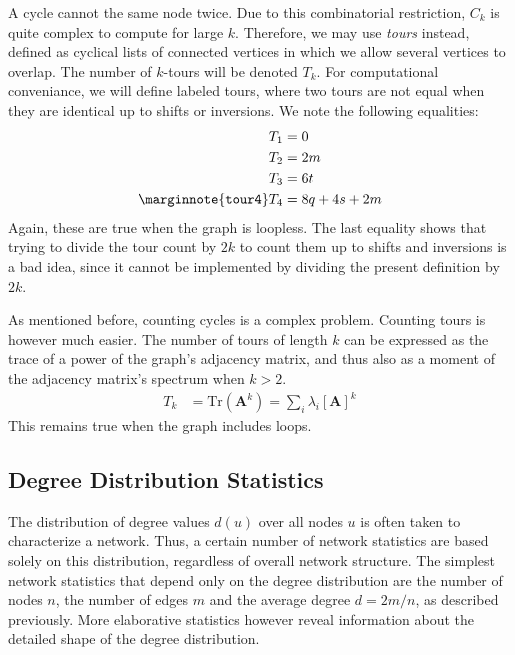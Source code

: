 \documentclass{article}
\begin{document}
A cycle cannot the same node twice.  Due to this combinatorial
restriction, $C_k$ is quite complex to compute for large $k$.
Therefore, we may use \emph{tours} instead, defined as cyclical lists of
connected vertices in which we allow several vertices to overlap.  The
number of $k$-tours will be denoted $T_k$.  For computational
conveniance, we will define labeled tours, where two tours are not equal
when they are identical up to shifts or inversions.  
We note the following equalities: 
\begin{align}
  T_1 &= 0 \nonumber \\
  T_2 &= 2m \nonumber \\
  T_3 &= 6t \nonumber \\
  \marginnote{\texttt{tour4}}
  T_4 &= 8q + 4s + 2m 
\end{align}
Again, these are true when the graph is loopless.  The last equality
shows that trying to divide the tour count by $2k$ to count them up to
shifts and inversions is a bad idea, since it cannot be implemented by
dividing the present definition by $2k$. 

As mentioned before, counting cycles is a complex problem.  Counting
tours is however much easier.  The number of tours of length $k$ can be
expressed as the trace of a power of the graph's adjacency matrix, and
thus also as a moment of the adjacency matrix's spectrum when $k > 2$.  
\begin{align*}
  T_k &= \mathrm{Tr}(\mathbf A^k) = \sum_i \lambda_i[\mathbf A]^k
\end{align*}
This remains true when the graph includes loops.  

\subsection{Degree Distribution Statistics}
The distribution of degree values $d(u)$ over all nodes $u$ is often
taken to characterize a network.  Thus, a certain number of network
statistics are based solely on this distribution, regardless of overall
network structure.  
The simplest network statistics that depend only on the degree
distribution are the number of nodes $n$, the number of edges $m$ and
the average degree $d=2m/n$, as described previously.  More elaborative
statistics however reveal information about the detailed shape of the
degree distribution. 
\end{document}
